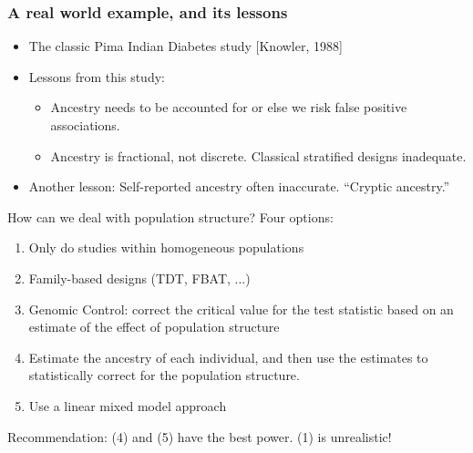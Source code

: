 \documentclass[serif,professionalfonts,svgnames]{beamer}
\begin{document}
\begin{frame}
\frametitle{A real world example, and its lessons}
\begin{itemize}
\item{The classic Pima Indian Diabetes study [Knowler, 1988]

\begin{center}
\end{center}
}

\item Lessons from this study:
\begin{itemize}
\item Ancestry needs to be accounted for or else we risk false positive associations.
\item Ancestry is fractional, not discrete.  Classical stratified designs inadequate.
\end{itemize}
\item Another lesson: Self-reported ancestry often inaccurate.  ``Cryptic ancestry.''
\end{itemize}

\end{frame}

\begin{frame}{How can we deal with population structure?}
Four options:
\begin{enumerate}
\item Only do studies within homogeneous populations
\item Family-based designs (TDT, FBAT, ...)
\item Genomic Control: correct the critical value for the test
  statistic based on an estimate of the effect of population structure
\item Estimate the ancestry of each individual, and then use the
  estimates to statistically correct for the population structure.
\item Use a linear mixed model approach
\end{enumerate}

Recommendation: (4) and (5) have the best power.  (1) is unrealistic!
\end{frame}
\end{document}
